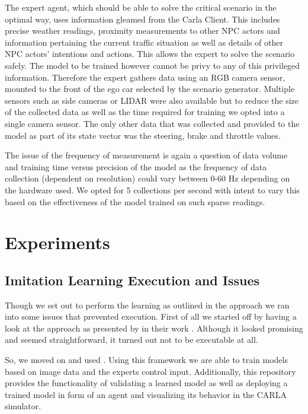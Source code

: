 \documentclass[conference, a4paper, 11pt]{IEEEtran}
\begin{document}
	The expert agent, which should be able to solve the critical scenario in the optimal way, uses information gleamed from the Carla Client. This includes precise weather readings, proximity measurements to other NPC actors and information pertaining the current traffic situation as well as details of other NPC actors' intentions and actions. This allows the expert to solve the scenario safely. The model to be trained however cannot be privy to any of this privileged information. Therefore the expert gathers data using an RGB camera sensor, mounted to the front of the ego car selected by the scenario generator. Multiple sensors such as side cameras or LIDAR were also available but to reduce the size of the collected data as well as the time required for training we opted into a single camera sensor. The only other data that was collected and provided to the model as part of its state vector was the steering, brake and throttle values.
	
	The issue of the frequency of measurement is again a question of data volume and training time versus precision of the model as the frequency of data collection (dependent on resolution) could vary between 0-60 Hz depending on the hardware used. We opted for 5 collections per second with intent to vary this based on the effectiveness of the model trained on such sparse readings.
	
	\section{Experiments}
	\subsection{Imitation Learning Execution and Issues}
	Though we set out to perform the learning as outlined in the approach we ran into some issues that prevented execution. 
	First of all we started off by having a look at the approach as presented by \citeauthor{Xiao2020ActionBasedRL} in their work  \cite{Xiao2020ActionBasedRL, ActionBasedRL:github}. Although it looked promising and seemed straightforward, it turned out not to be executable at all.
	
	So, we moved on and used  \cite{Toromanoff_2020_CVPR}. Using this framework we are able to train models based on image data and the experts control input. Additionally, this repository provides the functionality of validating a learned model as well as deploying a trained model in form of an agent and visualizing its behavior in the CARLA simulator.
	
\end{document}
